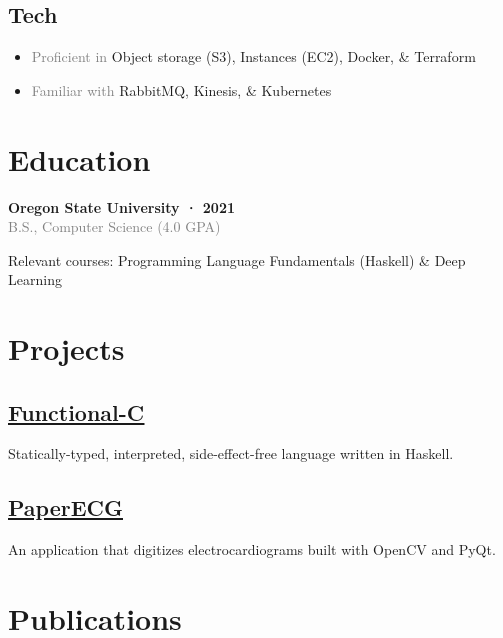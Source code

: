 \documentclass[12pt]{article} %
\providecommand{\tightlist}{%
  \setlength{\itemsep}{0pt}\setlength{\parskip}{0pt}}
\let\defaultref\href
\renewcommand{\href}[2]{%
  \defaultref{#1}{\ul{#2}}%
}
\renewcommand{\emph}[1]{%
  \textcolor{gray}{#1}%
}
\begin{document}
\begin{paracol}{2}
\begin{raggedright}
\hypertarget{tech}{%
\subsection{Tech}\label{tech}}

\begin{itemize}
\tightlist
\item
  \emph{Proficient in} Object storage (S3), Instances (EC2), Docker, \&
  Terraform
\item
  \emph{Familiar with} RabbitMQ, Kinesis, \& Kubernetes
\end{itemize}

\hypertarget{education}{%
\section{Education}\label{education}}

\vspace{1pt}

\textbf{Oregon State University · 2021}\\
\emph{B.S., Computer Science (4.0 GPA)}

Relevant courses: Programming Language Fundamentals (Haskell) \& Deep
Learning

\hypertarget{projects}{%
\section{Projects}\label{projects}}

\hypertarget{functional-c}{%
\subsection{\texorpdfstring{\href{https://github.com/julianfortune/CS381Project}{Functional-C}}{Functional-C}}\label{functional-c}}

Statically-typed, interpreted, side-effect-free language written in
Haskell.

\hypertarget{paperecg}{%
\subsection{\texorpdfstring{\href{https://github.com/Tereshchenkolab/paper-ecg}{PaperECG}}{PaperECG}}\label{paperecg}}

An application that digitizes electrocardiograms built with OpenCV and
PyQt.

\hypertarget{publications}{%
\section{Publications}\label{publications}}


\end{raggedright}
\end{paracol}
\end{document}
